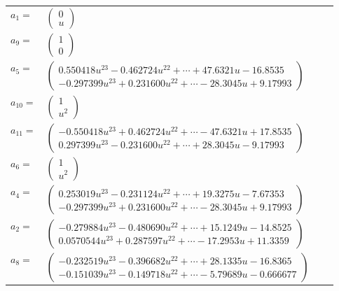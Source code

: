 \documentclass[1p]{elsarticle_modified}
\theoremstyle{definition}
\begin{document}
\begin{tabular}{m{7pt} m{180pt} m{7pt} m{180pt} }
\flushright $a_{1}=$&$\begin{pmatrix}0\\u\end{pmatrix}$ \\
\flushright $a_{9}=$&$\begin{pmatrix}1\\0\end{pmatrix}$ \\
\flushright $a_{5}=$&$\begin{pmatrix}0.550418 u^{23}-0.462724 u^{22}+\cdots+47.6321 u-16.8535\\-0.297399 u^{23}+0.231600 u^{22}+\cdots-28.3045 u+9.17993\end{pmatrix}$ \\
\flushright $a_{10}=$&$\begin{pmatrix}1\\u^2\end{pmatrix}$ \\
\flushright $a_{11}=$&$\begin{pmatrix}-0.550418 u^{23}+0.462724 u^{22}+\cdots-47.6321 u+17.8535\\0.297399 u^{23}-0.231600 u^{22}+\cdots+28.3045 u-9.17993\end{pmatrix}$ \\
\flushright $a_{6}=$&$\begin{pmatrix}1\\u^2\end{pmatrix}$ \\
\flushright $a_{4}=$&$\begin{pmatrix}0.253019 u^{23}-0.231124 u^{22}+\cdots+19.3275 u-7.67353\\-0.297399 u^{23}+0.231600 u^{22}+\cdots-28.3045 u+9.17993\end{pmatrix}$ \\
\flushright $a_{2}=$&$\begin{pmatrix}-0.279884 u^{23}-0.480690 u^{22}+\cdots+15.1249 u-14.8525\\0.0570544 u^{23}+0.287597 u^{22}+\cdots-17.2953 u+11.3359\end{pmatrix}$ \\
\flushright $a_{8}=$&$\begin{pmatrix}-0.232519 u^{23}-0.396682 u^{22}+\cdots+28.1335 u-16.8365\\-0.151039 u^{23}-0.149718 u^{22}+\cdots-5.79689 u-0.666677\end{pmatrix}$ \\

\end{tabular}
\end{document}
